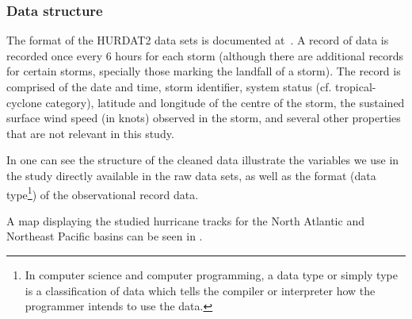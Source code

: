 \subsubsection{Data structure}
The format of the HURDAT2 data sets is documented at~\cite{Landsea2014,Landsea2016}. A record of data is recorded once every 6 hours for each storm (although there are additional records for certain storms, specially those marking the landfall of a storm). The record is comprised of the date and time, storm identifier, system status (cf. tropical-cyclone category), latitude and longitude of the centre of the storm, the sustained surface wind speed (in knots) observed in the storm, and several other properties that are not relevant in this study.

In  one can see the structure of the cleaned data illustrate the variables we use in the study directly available in the raw data sets, as well as the format (data type\footnote{In computer science and computer programming, a data type or simply type is a classification of data which tells the compiler or interpreter how the programmer intends to use the data. }) of the observational record data.
\begin{table}[H]
	\centering
	\ttfamily
	\caption{Excerpt of the North Atlantic data set}
	\label{hd:hurdat-head}
\end{table}

A map displaying the studied hurricane tracks for the North Atlantic and Northeast Pacific basins can be seen in .

